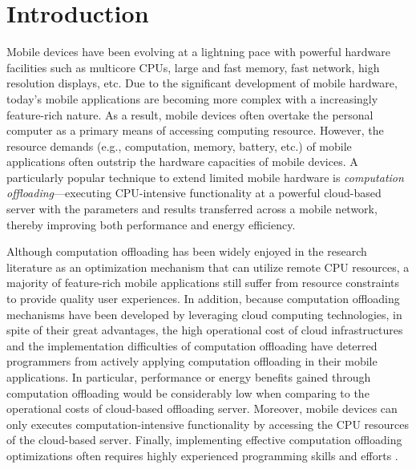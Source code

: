 \documentclass[conference]{IEEEtran}
\begin{document}
%
\IEEEpeerreviewmaketitle



\section{Introduction}
Mobile devices have been evolving at a lightning pace with powerful hardware facilities such as multicore CPUs, large and fast memory, fast network, high resolution displays, etc. Due to the significant development of mobile hardware, today's mobile applications are becoming more complex with a increasingly feature-rich nature. As a result, mobile devices often overtake the personal computer as a primary means of accessing computing resource. However, the resource demands (e.g., computation, memory, battery, etc.) of mobile applications often outstrip the hardware capacities of mobile devices. A particularly popular technique to extend limited mobile hardware is \emph{computation offloading}---executing CPU-intensive functionality at a powerful cloud-based server with the parameters and results transferred across a mobile network, thereby improving both performance and energy efficiency. 

Although computation offloading has been widely enjoyed in the research literature as an optimization mechanism that can utilize remote CPU resources, a majority of feature-rich mobile applications still suffer from resource constraints to provide quality user experiences. In addition, because computation offloading mechanisms have been developed by leveraging cloud computing technologies, in spite of their great advantages, the high operational cost of cloud infrastructures and the implementation difficulties of computation offloading have deterred programmers from actively applying computation offloading in their mobile applications. In particular, performance or energy benefits gained through computation offloading would be considerably low when comparing to the operational costs of cloud-based offloading server. Moreover, mobile devices can only executes computation-intensive functionality by accessing the CPU resources of the cloud-based server. Finally, implementing effective computation offloading optimizations often requires highly experienced programming skills and efforts \cite{}.
\end{document}
